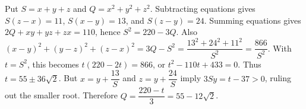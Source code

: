 Put $S=x+y+z$ and $Q=x^2+y^2+z^2$. Subtracting equations gives $S(z-x)=11$, $S(x-y)=13$, and $S(z-y)=24$. Summing equations gives $2Q+xy+yz+zx=110$, hence $S^2=220-3Q$. Also $(x-y)^2+(y-z)^2+(z-x)^2=3Q-S^2=\dfrac{13^2+24^2+11^2}{S^2}=\dfrac{866}{S^2}$. With $t=S^2$, this becomes $t(220-2t)=866$, or $t^2-110t+433=0$. Thus $t=55\pm36\sqrt2$. But $x=y+\dfrac{13}{S}$ and $z=y+\dfrac{24}{S}$ imply $3Sy=t-37>0$, ruling out the smaller root. Therefore $Q=\dfrac{220-t}{3}=\boxed{55-12\sqrt2}$.
